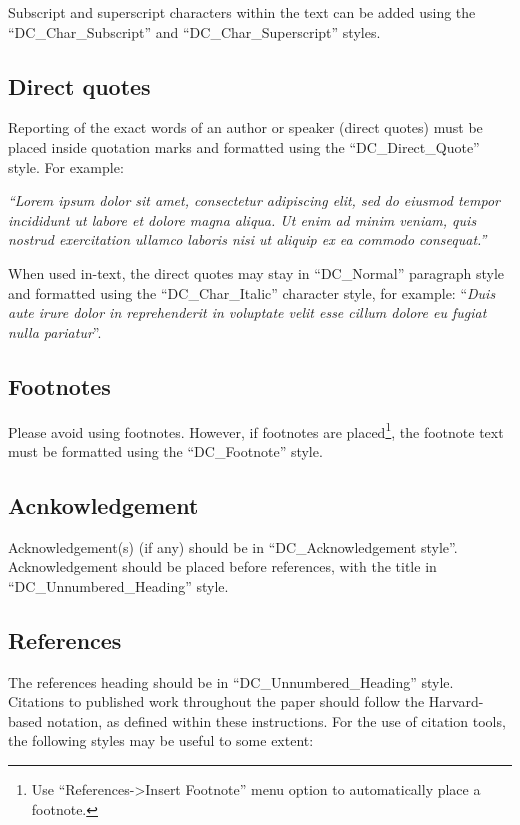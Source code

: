 \documentclass{design}
\begin{document}
Subscript and superscript characters within the text can be added using the “DC\_Char\_Subscript” and “DC\_Char\_Superscript” styles.

\subsection{Direct quotes}

Reporting of the exact words of an author or speaker (direct quotes) must be placed inside quotation marks and formatted using the “DC\_Direct\_Quote” style. For example:

\begin{displayquote}\it
“Lorem ipsum dolor sit amet, consectetur adipiscing elit, sed do eiusmod tempor incididunt ut labore et dolore magna aliqua. Ut enim ad minim veniam, quis nostrud exercitation ullamco laboris nisi ut aliquip ex ea commodo consequat.”
\end{displayquote}

When used in-text, the direct quotes may stay in “DC\_Normal” paragraph style and formatted using the “DC\_Char\_Italic” character style, for example: “\textit{Duis aute irure dolor in reprehenderit in voluptate velit esse cillum dolore eu fugiat nulla pariatur}”.

\subsection{Footnotes}

Please avoid using footnotes. However, if footnotes are placed\footnote{Use “References->Insert Footnote” menu option to automatically place a footnote.}, the footnote text must be formatted  using the “DC\_Footnote” style.

\subsection*{Acnkowledgement}

Acknowledgement(s) (if any) should be in “DC\_Acknowledgement style”. Acknowledgement should be placed before references, with the title in “DC\_Unnumbered\_Heading” style.

\subsection{References}

The references heading should be in “DC\_Unnumbered\_Heading” style. Citations to published work throughout the paper should follow the Harvard-based notation, as defined within these instructions. For the use of citation tools, the following styles may be useful to some extent:
\end{document}
